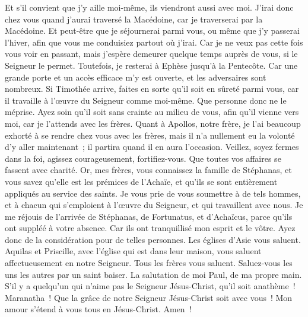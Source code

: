 \begin{multicols}{2}
Et s'il convient que j'y aille moi-même, ils viendront aussi avec moi.
J'irai donc chez vous quand j'aurai traversé la Macédoine, car je traverserai par la Macédoine.
Et peut-être que je séjournerai parmi vous, ou même que j'y passerai l'hiver, afin que vous me conduisiez partout où j'irai.
Car je ne veux pas cette fois vous voir en passant, mais j'espère demeurer quelque temps auprès de vous, si le Seigneur le permet.
Toutefois, je resterai à Ephèse jusqu'à la Pentecôte.
Car une grande porte et un accès efficace m'y est ouverte, et les adversaires sont nombreux.
Si Timothée arrive, faites en sorte qu'il soit en sûreté parmi vous, car il travaille à l'œuvre du Seigneur comme moi-même.
Que personne donc ne le méprise. Ayez soin qu'il soit sans crainte au milieu de vous, afin qu'il vienne vers moi, car je l'attends avec les frères.
Quant à Apollos, notre frère, je l'ai beaucoup exhorté à se rendre chez vous avec les frères, mais il n'a nullement eu la volonté d'y aller maintenant~; il partira quand il en aura l'occasion.
Veillez, soyez fermes dans la foi, agissez courageusement, fortifiez-vous.
Que toutes vos affaires se fassent avec charité.
Or, mes frères, vous connaissez la famille de Stéphanas, et vous savez qu'elle est les prémices de l'Achaïe, et qu'ils se sont entièrement appliqués au service des saints.
Je vous prie de vous soumettre à de tels hommes, et à chacun qui s'emploient à l'œuvre du Seigneur, et qui travaillent avec nous.
Je me réjouis de l'arrivée de Stéphanas, de Fortunatus, et d'Achaïcus, parce qu'ils ont suppléé à votre absence.
Car ils ont tranquillisé mon esprit et le vôtre. Ayez donc de la considération pour de telles personnes.
Les églises d'Asie vous saluent. Aquilas et Priscille, avec l'église qui est dans leur maison, vous saluent affectueusement en notre Seigneur.
Tous les frères vous saluent. Saluez-vous les uns les autres par un saint baiser.
La salutation de moi Paul, de ma propre main.
S'il y a quelqu'un qui n'aime pas le Seigneur Jésus-Christ, qu'il soit anathème~! Maranatha~!
Que la grâce de notre Seigneur Jésus-Christ soit avec vous~!
Mon amour s'étend à vous tous en Jésus-Christ. Amen~!
\PPE{}
\end{multicols}
